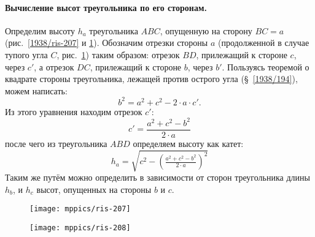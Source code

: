 \paragraph{Вычисление высот треугольника по его сторонам.}\label{1938/198}
Определим высоту $h_a$ треугольника $ABC$, опущенную на сторону $BC=a$ (рис.~\ref{1938/ris-207} и \ref{1938/ris-208}).
Обозначим отрезки стороны $a$ (продолженной в случае тупого угла $C$, рис.~\ref{1938/ris-208}) таким образом:
отрезок $BD$, прилежащий к стороне $c$, через $c'$, а отрезок $DC$, прилежащий к стороне $b$, через $b'$.
Пользуясь теоремой о квадрате стороны треугольника, лежащей против острого угла (§~\ref{1938/194}), можем написать:
\[b^2=a^2+c^2-2\cdot a\cdot c'.\]
Из этого уравнения находим отрезок $c'$:
\[c'=\frac{a^2+c^2-b^2}{2\cdot a}\]
после чего из треугольника $ABD$ определяем высоту как катет:
\[h_a=\sqrt{c^2-\left(\tfrac{a^2+c^2-b^2}{2\cdot a}\right)^2}\]
Таким же путём можно определить в зависимости от сторон треугольника длины $h_b$, и $h_c$ высот, опущенных на стороны $b$ и $c$.

\begin{figure}[h!]
\begin{minipage}{.48\textwidth}
\centering
\texttt{[image: mppics/ris-207]}
\end{minipage}
\hfill
\begin{minipage}{.48\textwidth}
\centering
\texttt{[image: mppics/ris-208]}
\end{minipage}

\medskip

\begin{minipage}{.48\textwidth}
\centering
\caption{}\label{1938/ris-207}
\end{minipage}
\hfill
\begin{minipage}{.48\textwidth}
\centering
\caption{}\label{1938/ris-208}
\end{minipage}
\vskip-4mm
\end{figure}